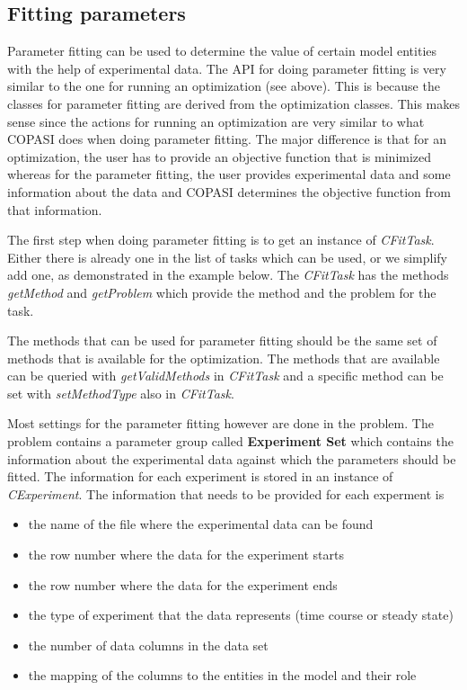 \documentclass[a4,10pt]{article}
\begin{document}
\subsection{Fitting parameters}
\label{ParameterFitting}

Parameter fitting can be used to determine the value of certain model entities with the help of experimental data.
The API for doing parameter fitting is very similar to the one for running an optimization (see above). This is because the classes for parameter fitting are derived from the optimization classes.
This makes sense since the actions for running an optimization are very similar to what COPASI does when doing parameter fitting. The major difference is that for an optimization, the user has to provide an objective function that is minimized whereas for the parameter fitting, the user provides experimental data and some information about the data and COPASI determines the objective function from that information.

The first step when doing parameter fitting is to get an instance of \textit{CFitTask}. Either there is already one in the list of tasks which can be used, or we simplify add one, as demonstrated in the example below.
The \textit{CFitTask} has the methods \textit{getMethod} and \textit{getProblem} which provide the method and the problem for the task.

The methods that can be used for parameter fitting should be the same set of methods that is available for the optimization. The methods that are available can be queried with \textit{getValidMethods} in \textit{CFitTask} and a specific method can be set with \textit{setMethodType} also in \textit{CFitTask}.

Most settings for the parameter fitting however are done in the problem. The problem contains a parameter group called \textbf{Experiment Set} which contains the information about the experimental data against which the parameters should be fitted.
The information for each experiment is stored in an instance of \textit{CExperiment}. The information that needs to be provided for each experment is 
\begin{itemize}
\item{the name of the file where the experimental data can be found}
\item{the row number where the data for the experiment starts}
\item{the row number where the data for the experiment ends}
\item{the type of experiment that the data represents (time course or steady state)}
\item{the number of data columns in the data set}
\item{the mapping of the columns to the entities in the model and their role}
\end{itemize}
\end{document}
